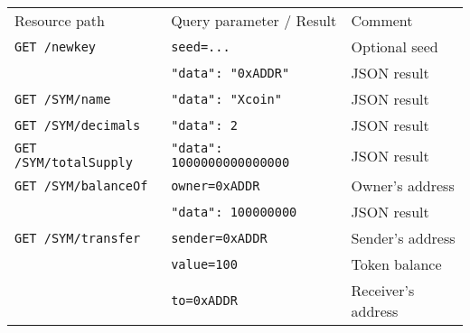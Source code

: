 \documentclass[12pt,a4paper, twocolumn]{article}
\begin{document}
\begin{table}[H]
\centering
\label{Appendix}
\begin{tabular}{lll}
Resource path                    & Query parameter / Result                                                                                                                                & Comment                  \\
\texttt{GET /newkey}           & \texttt{seed=...}                                                                                                                                     & Optional seed            \\
& \texttt{{"data": "0xADDR"}}                                                                                                                         & JSON result              \\
\texttt{GET /SYM/name}         & \texttt{{"data": "Xcoin"}}                                                                                                                          & JSON result              \\
\texttt{GET /SYM/decimals}     & \texttt{{"data": 2}}                                                                                                                                & JSON result              \\
\texttt{GET /SYM/totalSupply}  & \texttt{{"data": 1000000000000000}}                                                                                                                 & JSON result              \\
\texttt{GET /SYM/balanceOf}    & \texttt{owner=0xADDR}                                                                                                                                 & Owner’s address          \\
& \texttt{{"data": 100000000}}                                                                                                                        & JSON result              \\
\texttt{GET /SYM/transfer}     & \texttt{sender=0xADDR}                                                                                                                                & Sender’s address         \\
& \texttt{value=100}                                                                                                                                    & Token balance            \\
& \texttt{to=0xADDR}                                                                                                                                    & Receiver’s address       \\

\end{tabular}
\end{table}
\end{document}
